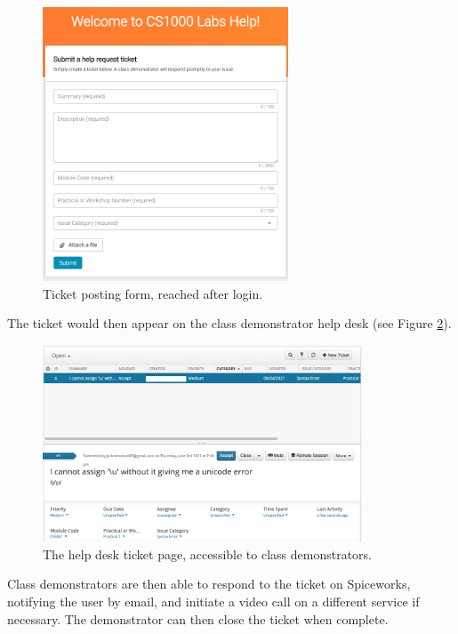 \FloatBarrier
\begin{figure}[H]
  \centering
  \includegraphics[width=0.65\textwidth]{2context/images/SWpostTicket.png}
  \caption{Ticket posting form, reached after login.}
  \label{fig:spiceform}
\end{figure}

The ticket would then appear on the class demonstrator help desk (see Figure \ref{fig:spicedesk}).

\FloatBarrier
\begin{figure}[H]
  \centering
  \includegraphics[width=0.85\textwidth]{2context/images/SWticketPage.png}
  \caption{The help desk ticket page, accessible to class demonstrators.}
  \label{fig:spicedesk}
\end{figure}

Class demonstrators are then able to respond to the ticket on Spiceworks, notifying the user by email, and initiate a video call on a different service if necessary. The demonstrator can then close the ticket when complete.

